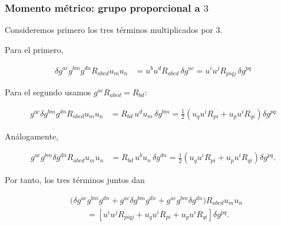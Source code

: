\documentclass{beamer}
\begin{document}
\begin{frame}[label=nav-frame-102]
\frametitle{Momento métrico: grupo proporcional a \(3\)}
\scriptsize

Consideremos primero los tres términos multiplicados por \(3\).

Para el primero,

\begin{align*}
\delta g^{ac}g^{bm}g^{dn}
R_{abcd}u_m u_n
&=
u^bu^dR_{abcd}\,\delta g^{ac} = u^iu^jR_{piqj}\,\delta g^{pq}
\end{align*}


Para el segundo usamos \(g^{ac}R_{abcd}=R_{bd}\):

\begin{align*}
g^{ac}\delta g^{bm}g^{dn}
R_{abcd}u_m u_n
&=
R_{bd}\,u^d u_m\,\delta g^{bm}=
\frac12
\left(
u_q u^iR_{pi}
+
u_p u^iR_{qi}
\right)
\delta g^{pq}
\end{align*}

Análogamente,

\begin{align*}
g^{ac}g^{bm}\delta g^{dn}
R_{abcd}u_m u_n
&=
R_{bd}\,u^b u_n\,\delta g^{dn}=
\frac12
\left(
u_q u^iR_{pi}
+
u_p u^iR_{qi}
\right)
\delta g^{pq}.
\end{align*}


Por tanto, los tres términos juntos dan

\begin{equation}
\boxed{
\begin{aligned}
&
\Big(
\delta g^{ac}g^{bm}g^{dn}
+
g^{ac}\delta g^{bm}g^{dn}
+
g^{ac}g^{bm}\delta g^{dn}
\Big)
R_{abcd}u_m u_n
\\[1mm]
&\qquad=
\left[
u^iu^jR_{piqj}
+
u_q u^iR_{pi}
+
u_p u^iR_{qi}
\right]\delta g^{pq}.
\end{aligned}
}
\label{eq:Pbeta-grupo-positivo}
\end{equation}

\end{frame}
\end{document}
